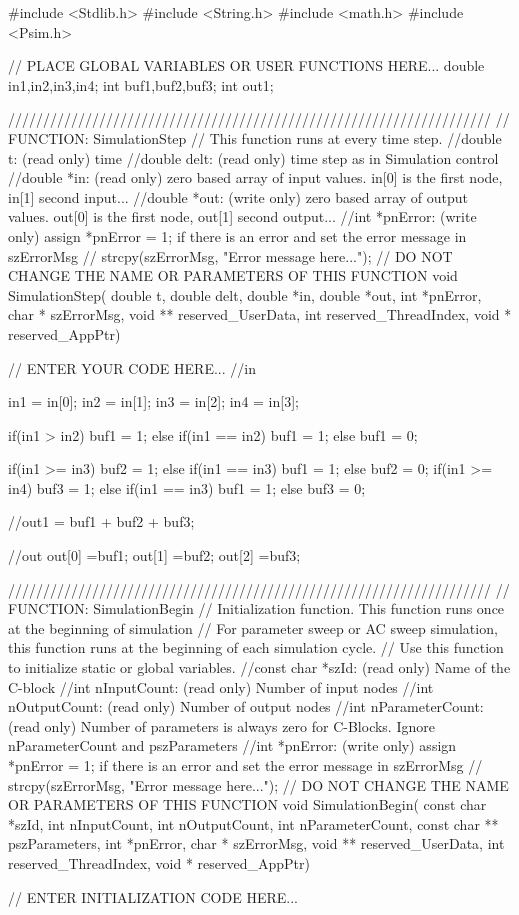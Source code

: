 \begin{mylisting}[language=c,caption=1番レグ用比較モジュール,label=hurokuB_hikakuA]

#include <Stdlib.h>
#include <String.h>
#include <math.h>
#include <Psim.h>

// PLACE GLOBAL VARIABLES OR USER FUNCTIONS HERE...
double in1,in2,in3,in4;
int buf1,buf2,buf3;
int out1;

/////////////////////////////////////////////////////////////////////
// FUNCTION: SimulationStep
//   This function runs at every time step.
//double t: (read only) time
//double delt: (read only) time step as in Simulation control
//double *in: (read only) zero based array of input values. in[0] is the first node, in[1] second input...
//double *out: (write only) zero based array of output values. out[0] is the first node, out[1] second output...
//int *pnError: (write only)  assign  *pnError = 1;  if there is an error and set the error message in szErrorMsg
//    strcpy(szErrorMsg, "Error message here..."); 
// DO NOT CHANGE THE NAME OR PARAMETERS OF THIS FUNCTION
void SimulationStep(
		double t, double delt, double *in, double *out,
		 int *pnError, char * szErrorMsg,
		 void ** reserved_UserData, int reserved_ThreadIndex, void * reserved_AppPtr)
{
// ENTER YOUR CODE HERE...
//in

in1 = in[0];
in2 = in[1];
in3 = in[2];
in4 = in[3];

	if(in1 > in2){
	buf1 = 1;
	}else if(in1 == in2){
	buf1 = 1;
	}else{
	buf1 = 0;
	}

	if(in1 >= in3){
	buf2 = 1;
	}else if(in1 == in3){
	buf1 = 1;
	}else{
	buf2 = 0;
	}
	if(in1 >= in4){
	buf3 = 1;
	}else if(in1 == in3){
	buf1 = 1;
	}else{
	buf3 = 0;
	}
	
	//out1 = buf1 + buf2 + buf3;

//out
out[0] =buf1;
out[1] =buf2;
out[2] =buf3;
}


/////////////////////////////////////////////////////////////////////
// FUNCTION: SimulationBegin
//   Initialization function. This function runs once at the beginning of simulation
//   For parameter sweep or AC sweep simulation, this function runs at the beginning of each simulation cycle.
//   Use this function to initialize static or global variables.
//const char *szId: (read only) Name of the C-block 
//int nInputCount: (read only) Number of input nodes
//int nOutputCount: (read only) Number of output nodes
//int nParameterCount: (read only) Number of parameters is always zero for C-Blocks.  Ignore nParameterCount and pszParameters
//int *pnError: (write only)  assign  *pnError = 1;  if there is an error and set the error message in szErrorMsg
//    strcpy(szErrorMsg, "Error message here..."); 
// DO NOT CHANGE THE NAME OR PARAMETERS OF THIS FUNCTION
void SimulationBegin(
		const char *szId, int nInputCount, int nOutputCount,
		 int nParameterCount, const char ** pszParameters,
		 int *pnError, char * szErrorMsg,
		 void ** reserved_UserData, int reserved_ThreadIndex, void * reserved_AppPtr)
{
// ENTER INITIALIZATION CODE HERE...




}
\end{mylisting}

